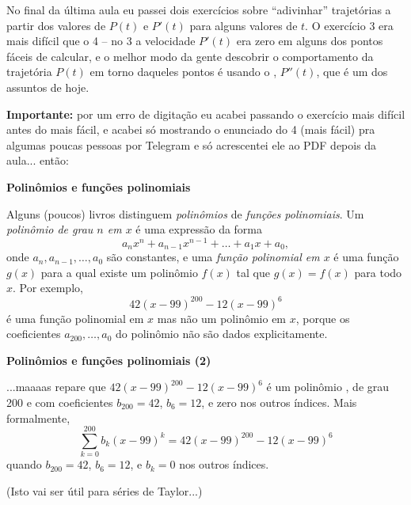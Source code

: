 \documentclass[oneside,12pt]{article}
\begin{document}
\newpage

No final da última aula eu passei dois exercícios sobre ``adivinhar''
trajetórias a partir dos valores de $P(t)$ e $P'(t)$ para alguns
valores de $t$. O exercício 3 era mais difícil que o 4 -- no 3 a
velocidade $P'(t)$ era zero em alguns dos pontos fáceis de calcular, e
o melhor modo da gente descobrir o comportamento da trajetória $P(t)$
em torno daqueles pontos é usando o ,
$P''(t)$, que é um dos assuntos de hoje.

\bsk

{\bf Importante:} por um erro de digitação eu acabei passando o
exercício mais difícil antes do mais fácil, e acabei só mostrando o
enunciado do 4 (mais fácil) pra algumas poucas pessoas por Telegram e
só acrescentei ele ao PDF depois da aula... então: 



\newpage


{\bf Polinômios e funções polinomiais}

Alguns (poucos) livros distinguem {\sl polinômios} de {\sl funções
  polinomiais}. Um {\sl polinômio de grau $n$ em $x$} é uma expressão
da forma
%
$$ a_n x^n + a_{n-1} x^{n-1} + \ldots + a_1 x + a_0, $$
%
onde $a_n, a_{n-1}, \ldots, a_0$ são constantes, e uma {\sl função
  polinomial em $x$} é uma função $g(x)$ para a qual existe um
polinômio $f(x)$ tal que $g(x)=f(x)$ para todo $x$. Por exemplo,
%
$$ 42 (x-99)^{200} - 12 (x-99)^6 $$
%
é uma função polinomial em $x$ mas não um polinômio em $x$, porque os
coeficientes $a_{200}, \ldots, a_0$ do polinômio não são dados
explicitamente.

\msk

\newpage

{\bf Polinômios e funções polinomiais (2)}

...maaaas repare que $42 (x-99)^{200} - 12 (x-99)^6$ é um polinômio
, de grau 200 e com coeficientes $b_{200}=42$,
$b_6=12$, e zero nos outros índices. Mais formalmente,
%
$$\sum_{k=0}^{200} b_k (x - 99)^k = 42 (x-99)^{200} - 12 (x-99)^6$$
%
quando $b_{200}=42$, $b_6=12$, e $b_k=0$ nos outros índices.

\bsk

(Isto vai ser útil para séries de Taylor...)
\end{document}
